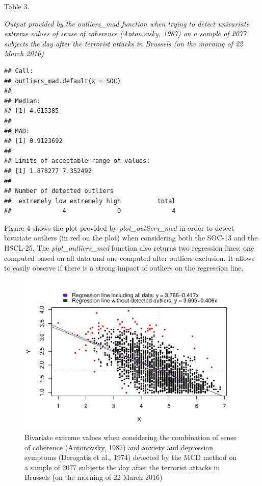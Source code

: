 \documentclass[man,floatsintext]{apa6}
\begin{document}
Table 3.

\emph{Output provided by the outliers\_mad function when trying to detect univariate extreme values of sense of coherence (Antonovsky, 1987) on a sample of 2077 subjects the day after the terrorist attacks in Brussels (on the morning of 22 March 2016)}

\begin{verbatim}
## Call:
## outliers_mad.default(x = SOC)
## 
## Median:
## [1] 4.615385
## 
## MAD:
## [1] 0.9123692
## 
## Limits of acceptable range of values:
## [1] 1.878277 7.352492
## 
## Number of detected outliers
##  extremely low extremely high          total 
##              4              0              4
\end{verbatim}

Figure 4 shows the plot provided by \emph{plot\_outliers\_mcd} in order to detect bivariate outliers (in red on the plot) when considering both the SOC-13 and the HSCL-25. The \emph{plot\_outliers\_mcd} function also returns two regression lines: one computed based on all data and one computed after outliers exclusion. It allows to easily observe if there is a strong impact of outliers on the regression line.

\begin{figure}
\centering
\includegraphics{Outliers_files/figure-latex/MCDSOC-1.pdf}
\caption{\label{fig:MCDSOC}Bivariate extreme values when considering the combination of sense of coherence (Antonovsky, 1987) and anxiety and depression symptoms (Derogatis et al., 1974) detected by the MCD method on a sample of 2077 subjects the day after the terrorist attacks in Brussels (on the morning of 22 March 2016)}
\end{figure}
\end{document}
